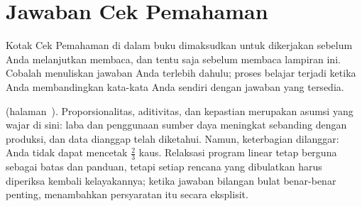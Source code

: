 
\chapter{Jawaban Cek Pemahaman}
\label{ch:checkpoint-answers}

Kotak Cek Pemahaman di dalam buku dimaksudkan untuk dikerjakan sebelum Anda melanjutkan membaca, dan tentu saja sebelum membaca lampiran ini. Cobalah menuliskan jawaban Anda terlebih dahulu; proses belajar terjadi ketika Anda membandingkan kata-kata Anda sendiri dengan jawaban yang tersedia.

\bigskip

\noindent\textbf{} (halaman~\pageref{lc:lp-assumptions}).
Proporsionalitas, aditivitas, dan kepastian merupakan asumsi yang wajar di sini: laba dan penggunaan sumber daya meningkat sebanding dengan produksi, dan data dianggap telah diketahui. Namun, keterbagian dilanggar: Anda tidak dapat mencetak $\tfrac23$ kaus. Relaksasi program linear tetap berguna sebagai batas dan panduan, tetapi setiap rencana yang dibulatkan harus diperiksa kembali kelayakannya; ketika jawaban bilangan bulat benar-benar penting, \OOIntegerProgrammingReference{} menambahkan persyaratan itu secara eksplisit.

